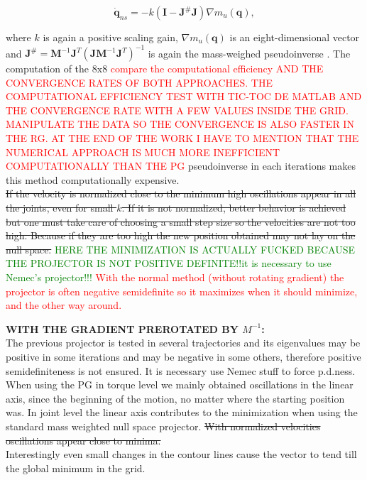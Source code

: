 \begin{equation}
\mathbf{\dot{q}}_{ns} =  - k (\mathbf{I} -  \mathbf{J}^{\#} \mathbf{J} ) \nabla m_u(\mathbf{q}), \label{eq:RG_dq}
\end{equation}

where  $k$ is again a positive scaling gain,  $\nabla m_u(\mathbf{q})$ is an eight-dimensional vector and $ \mathbf{J}^{\#} = \mathbf{M}^{-1} \mathbf{J}^{T} (\mathbf{J} \mathbf{M}^{-1} \mathbf{J}^{T})^{-1}$ is again the mass-weighed pseudoinverse \cite{khatib1995}. The computation of the $\mathrm{8x8}$ 	\textcolor{red}{{compare the computational efficiency AND THE CONVERGENCE RATES OF BOTH APPROACHES. THE COMPUTATIONAL EFFICIENCY TEST WITH TIC-TOC DE MATLAB AND THE CONVERGENCE RATE WITH A FEW VALUES INSIDE THE GRID. MANIPULATE THE DATA SO THE CONVERGENCE IS ALSO FASTER IN THE RG. AT THE END OF THE WORK I HAVE TO MENTION THAT THE NUMERICAL APPROACH IS MUCH MORE INEFFICIENT COMPUTATIONALLY THAN THE PG} }pseudoinverse in each iterations makes this method computationally expensive. \\


\st{ If the velocity is normalized close to the minimum high oscillations appear in all the joints, even for small $k$. If it is not normalized, better behavior is achieved but one must take care of choosing a small step size so the velocities are not too high. Because if they are too high the new position obtained may not lay on the null space.} \textcolor{green}{ HERE THE MINIMIZATION IS ACTUALLY FUCKED BECAUSE THE PROJECTOR IS NOT POSITIVE DEFINITE!!it is necessary to use Nemec's projector!!!} \textcolor{red}{With the normal method (without rotating gradient) the projector is often negative semidefinite so it maximizes when it should minimize, and the other way around.}


\textbf{WITH THE GRADIENT PREROTATED BY $M^{-1}$:}  \\
The previous projector is tested in several trajectories and its eigenvalues may be positive in some iterations and may be negative in some others, therefore positive semidefiniteness is not ensured. It is necessary use Nemec stuff to force p.d.ness.\\ When using the PG in torque level we mainly obtained oscillations in the linear axis, since the beginning of the motion, no matter where the starting position was. In joint level the linear axis contributes to the minimization when using the standard mass weighted null space projector. \st{With normalized velocities oscillations appear close to minima.} \\
Interestingly even small changes in the contour lines cause the vector to tend till the global minimum in the grid.

